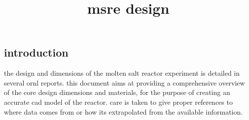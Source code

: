 \documentclass{article}
\title{msre design}
\author{}
\date{}
\begin{document}
\begin{preview}
\maketitle

\section{introduction}
the design and dimensions of the molten salt reactor experiment is detailed in several ornl reports. this document aims at providing a comprehensive overview of the core design dimensions and materials, for the purpose of creating an accurate cad model of the reactor.
care is taken to give proper references to where data comes from or how its extrapolated from the available information.


\end{preview}
\end{document}
